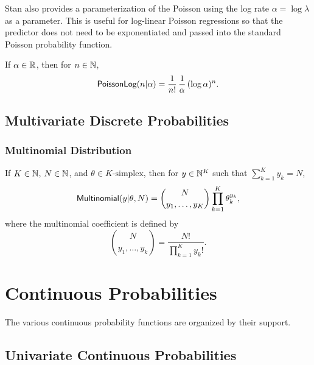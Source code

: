 Stan also provides a parameterization of the Poisson using the log
rate $\alpha = \log \lambda$ as a parameter.  This is useful for
log-linear Poisson regressions so that the predictor does not need to
be exponentiated and passed into the standard Poisson probability
function.

If $\alpha \in \mathbb{R}$, then for $n \in \mathbb{N}$,
\[
\mbox{\sf PoissonLog}(n|\alpha)
= 
\frac{1}{n!}
\,
\frac{1}{\alpha}
\,
(\log \alpha)^n.
\]

\begin{description}
\end{description}


\section{Multivariate Discrete Probabilities}

\subsection{Multinomial Distribution}

If $K \in \mathbb{N}$, $N \in \mathbb{N}$, and $\theta \in \mbox{$K$-simplex}$,
then for $y \in \mathbb{N}^K$ such that $\sum_{k=1}^K y_k = N$,
%
\[
\mbox{\sf Multinomial}(y|\theta,N)
= {N \choose {y_1,\ldots,y_K}} 
\prod_{k=1}^K \theta_k^{y_k},
\]
where the multinomial coefficient is defined by
\[
{N \choose {y_1,\ldots,y_k}}
= \frac{N!}{\prod_{k=1}^K y_k!}.
\]

\begin{description}
\end{description}


\chapter{Continuous Probabilities}\label{continuous-prob-functions.chapter}

\noindent
The various continuous probability functions are organized by their
support.

\section{Univariate Continuous Probabilities}

